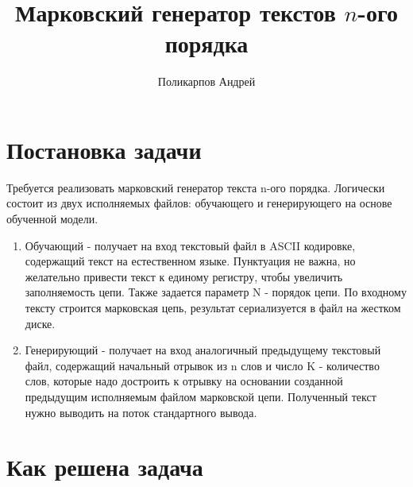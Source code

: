 \documentclass[a4paper]{article}
\title{Марковский генератор текстов $n$-ого порядка}
\author{Поликарпов Андрей}
\begin{document}
\maketitle

\newpage
\section{Постановка задачи}
Требуется реализовать марковский генератор текста n-ого порядка.
Логически состоит из двух исполняемых файлов: обучающего и генерирующего на основе обученной модели.
\begin{enumerate}
\item Обучающий -
	получает на вход текстовый файл в ASCII кодировке, содержащий текст на естественном языке. Пунктуация не важна, 
	но желательно привести текст к единому регистру, чтобы увеличить заполняемость цепи. Также задается параметр N - порядок цепи.
	По входному тексту строится марковская цепь, результат сериализуется в файл на жестком диске.
\item  Генерирующий -
получает на вход аналогичный предыдущему текстовый файл, содержащий начальный отрывок из n слов
и число K - количество слов, которые надо достроить к отрывку на основании созданной предыдущим исполняемым файлом марковской цепи.
Полученный текст нужно выводить на поток стандартного вывода. 
\end{enumerate}


\section{Как решена задача}
\end{document}

